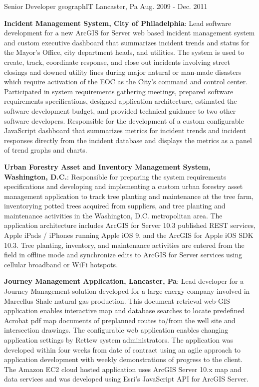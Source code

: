 \begin{cventries}
{    }
  \cventry
    {Senior Developer}
    {geographIT}
    {Lancaster, Pa}
    {Aug. 2009 - Dec. 2011}
    {
      \begin{cvitems}
        \item{\textbf{Incident Management System, City of Philadelphia}: Lead software development for a new ArcGIS for Server web based incident management system and custom executive dashboard that summarizes incident trends and status for the Mayor’s Office, city department heads, and utilities.  The system is used to create, track, coordinate response, and close out incidents involving street closings and downed utility lines during major natural or man-made disasters which require activation of the EOC as the City’s command and control center.  Participated in system requirements gathering meetings, prepared software requirements specifications, designed application architecture, estimated the software development budget, and provided technical guidance to two other software developers.  Responsible for the development of a custom configurable JavaScript dashboard that summarizes metrics for incident trends and incident responses directly from the incident database and displays the metrics as a panel of trend graphs and charts.}
        \bigskip
        \item{\textbf{Urban Forestry Asset and Inventory Management System, Washington, D.C.}: Responsible for preparing the system requirements specifications and developing and implementing a custom urban forestry asset management application to track tree planting and maintenance at the tree farm, inventorying potted trees acquired from suppliers, and tree planting and maintenance activities in the Washington, D.C. metropolitan area.  The application architecture includes ArcGIS for Server 10.3 published REST services, Apple iPads / iPhones running Apple iOS 9, and the ArcGIS for Apple iOS SDK 10.3.  Tree planting, inventory, and maintenance activities are entered from the field in offline mode and synchronize edits to ArcGIS for Server services using cellular broadband or WiFi hotspots.}
        \bigskip
        \item{\textbf{Journey Management Application, Lancaster, Pa}: Lead developer for a Journey Management solution developed for a large energy company involved in Marcellus Shale natural gas production.  This document retrieval web-GIS application enables interactive map and database searches to locate predefined Acrobat pdf map documents of preplanned routes to/from the well site and intersection drawings.  The configurable web application enables changing application settings by Rettew system administrators.  The application was developed within four weeks from date of contract using an agile approach to application development with weekly demonstrations of progress to the client.  The Amazon EC2 cloud hosted application uses ArcGIS Server 10.x map and data services and was developed using Esri’s JavaScript API for ArcGIS Server.}

\end{cvitems}}
\end{cventries}
